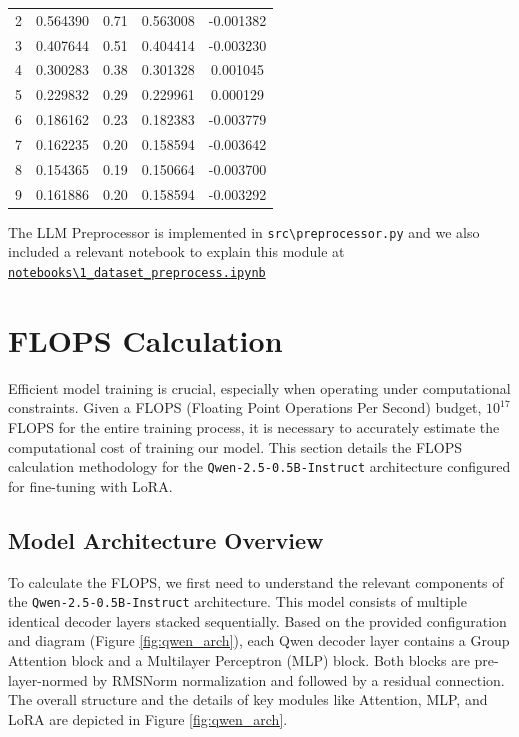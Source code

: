 \documentclass{article}
\begin{document}
\begin{table}[!th]
\begin{minipage}{0.48\textwidth}
\begin{tabular}{ccccc}
        2 & 0.564390 & 0.71 & 0.563008 & -0.001382 \\
        3 & 0.407644 & 0.51 & 0.404414 & -0.003230 \\
        4 & 0.300283 & 0.38 & 0.301328 & 0.001045 \\
        5 & 0.229832 & 0.29 & 0.229961 & 0.000129 \\
        6 & 0.186162 & 0.23 & 0.182383 & -0.003779 \\
        7 & 0.162235 & 0.20 & 0.158594 & -0.003642 \\
        8 & 0.154365 & 0.19 & 0.150664 & -0.003700 \\
        9 & 0.161886 & 0.20 & 0.158594 & -0.003292 \\
        \bottomrule
    \end{tabular}
\end{minipage}
\end{table}


The LLM Preprocessor is implemented in \texttt{src\textbackslash preprocessor.py} and we also included a relevant notebook to explain this module at \href{https://gitlab.developers.cam.ac.uk/phy/data-intensive-science-mphil/assessments/m2_coursework/ym429/-/blob/main/notebooks/1_dataset_preprocess.ipynb?ref_type=heads}{\texttt{notebooks\textbackslash 1\_dataset\_preprocess.ipynb}}

\section{FLOPS Calculation}

Efficient model training is crucial, especially when operating under computational constraints. Given a FLOPS (Floating Point Operations Per Second) budget, $10^{17}$ FLOPS for the entire training process, it is necessary to accurately estimate the computational cost of training our model. This section details the FLOPS calculation methodology for the \texttt{Qwen-2.5-0.5B-Instruct} architecture configured for fine-tuning with LoRA.

\subsection{Model Architecture Overview}

To calculate the FLOPS, we first need to understand the relevant components of the \texttt{Qwen-2.5-0.5B-Instruct} architecture. This model consists of multiple identical decoder layers stacked sequentially. Based on the provided configuration and diagram (Figure \ref{fig:qwen_arch}), each Qwen decoder layer contains a Group Attention block and a Multilayer Perceptron (MLP) block. Both blocks are pre-layer-normed by RMSNorm normalization and followed by a residual connection. The overall structure and the details of key modules like Attention, MLP, and LoRA are depicted in Figure \ref{fig:qwen_arch}.
\end{document}
